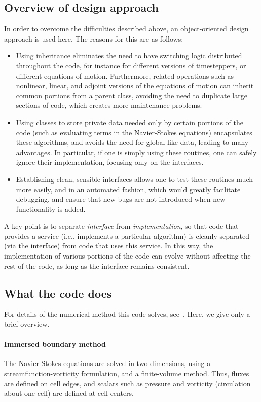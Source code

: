 \documentclass[11pt]{article}
\begin{document}
\subsection{Overview of design approach}
In order to overcome the difficulties described above, an object-oriented design approach is used here.  The reasons for this are as follows:
\begin{itemize}
	\item Using inheritance eliminates the need to have switching logic distributed throughout the code, for instance for different versions of timesteppers, or different equations of motion.  Furthermore, related operations such as nonlinear, linear, and adjoint versions of the equations of motion can inherit common portions from a parent class, avoiding the need to duplicate large sections of code, which creates more maintenance problems.
	\item Using classes to store private data needed only by certain portions of the code (such as evaluating terms in the Navier-Stokes equations) encapsulates these algorithms, and avoids the need for global-like data, leading to many advantages.  In particular, if one is simply using these routines, one can safely ignore their implementation, focusing only on the interfaces.
	\item Establishing clean, sensible interfaces allows one to test these routines much more easily, and in an automated fashion, which would greatly facilitate debugging, and ensure that new bugs are not introduced when new functionality is added.
\end{itemize}

A key point is to separate {\em interface} from {\em implementation}, so that code that provides a service (i.e., implements a particular algorithm) is cleanly separated (via the interface) from code that uses this service.  In this way, the implementation of various portions of the code can evolve without affecting the rest of the code, as long as the interface remains consistent.

\subsection{What the code does}
For details of the numerical method this code solves, see~\cite{ColTai-07}.  Here, we give only a brief overview.

\paragraph{Immersed boundary method}
The Navier Stokes equations are solved in two dimensions, using a streamfunction-vorticity formulation, and a finite-volume method.  Thus, fluxes are defined on cell edges, and scalars such as pressure and vorticity (circulation about one cell) are defined at cell centers.
\end{document}

